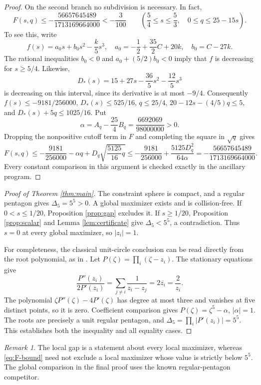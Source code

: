 \documentclass[11pt]{article}
\theoremstyle{remark}
\newtheorem{remark}[theorem]{Remark}
\numberwithin{equation}{section}
\begin{document}
\begin{proof}
On the second branch no subdivision is necessary. In fact,
\begin{equation}\label{eq:branch-b-analytic}
 F(s,q)\le-\frac{56657645489}{1713169664000}<-\frac3{100}
 \qquad\left(\frac54\le s\le\frac53,\quad 0\le q\le25-15s\right).
\end{equation}
To see this, write
\[
 f(s)=a_0s+b_0s^2-\frac{k}{5}s^3,\quad
 a_0=-\frac12+\frac{35}{2}C+20k,\quad b_0=C-27k.
\]
The rational inequalities $b_0<0$ and $a_0+(5/2)b_0<0$
imply that $f$ is decreasing for $s\ge5/4$. Likewise,
\[
 D_*(s)=15+27s-\frac{36}{5}s^2-\frac{12}{5}s^3
\]
is decreasing on this interval, since its derivative is at most $-9/4$.
Consequently $f(s)\le-9181/256000$, $D_*(s)\le525/16$,
$q\le25/4$, $20-12s-(4/5)q\le5$, and
$D_*(s)+5q\le1025/16$. Put
\[
 \alpha=A_q-\frac{25}{4}B_q=\frac{6692069}{98000000}>0.
\]
Dropping the nonpositive cutoff term in $F$ and completing the square
in $\sqrt q$ gives
\[
 F(s,q)\le-\frac{9181}{256000}-\alpha q
       +D_q\sqrt{\frac{5125}{16}q}
 \le-\frac{9181}{256000}
       +\frac{5125D_q^2}{64\alpha}
 =-\frac{56657645489}{1713169664000}.
\]
Every constant comparison in this argument is checked exactly in the
ancillary program.
\end{proof}

\begin{proof}[Proof of Theorem \ref{thm:main}]
The constraint sphere is compact, and a regular pentagon gives
$\Delta_5=5^5>0$. A global maximizer exists and is collision-free.
If $0<s\le1/20$, Proposition \ref{prop:gap} excludes it.
If $s\ge1/20$, Proposition \ref{prop:scalar} and
Lemma \ref{lem:certificate} give $\Delta_5<5^5$, a contradiction.
Thus $s=0$ at every global maximizer, so $|z_i|=1$.

For completeness, the classical unit-circle conclusion can be read
directly from the root polynomial, as in \cite{Mordell}.
Let $P(\zeta)=\prod_i(\zeta-z_i)$.
The stationary equations give
\[
 \frac{P''(z_i)}{2P'(z_i)}
 =\sum_{j\ne i}\frac1{z_i-z_j}=2\overline{z_i}=\frac2{z_i}.
\]
The polynomial $\zeta P''(\zeta)-4P'(\zeta)$ has degree at most three
and vanishes at five distinct points, so it is zero.
Coefficient comparison gives $P(\zeta)=\zeta^5-\alpha$, $|\alpha|=1$.
The roots are precisely a unit regular pentagon, and
$\Delta_5=\prod_i|P'(z_i)|=5^5$.
This establishes both the inequality and all equality cases.
\end{proof}

\begin{remark}
The local gap is a statement about every local maximizer, whereas
\eqref{eq:F-bound} need not exclude a local maximizer whose value is
strictly below $5^5$. The global comparison in the final proof uses the
known regular-pentagon competitor.
\end{remark}
\end{document}
